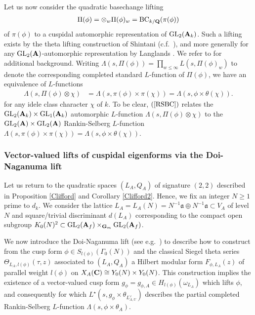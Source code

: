 \documentclass{amsart}
\theoremstyle{definition}
\theoremstyle{definition}
\theoremstyle{definition}
\begin{document}
Let us now consider the quadratic basechange lifting 
\begin{align*} \Pi(\phi) = \otimes_w \Pi(\phi)_w = \operatorname{BC}_{k/{\bf{Q}}}(\pi(\phi)) \end{align*} 
of $\pi(\phi)$ to a cuspidal automorphic representation of $\operatorname{GL}_2({\bf{A}}_k)$. Such a lifting exists by the theta 
lifting construction of Shintani (c.f.~\cite[$\S$2.7]{Br-123}), and more generally for any $\operatorname{GL}_2({\bf{A}})$-automorphic 
representation by Langlands \cite{La}. We refer to \cite{GL} for additional background.
Writing $\Lambda(s, \Pi(\phi)) = \prod_{w \leq \infty} L(s, \Pi(\phi)_w)$ to denote the corresponding completed 
standard $L$-function of $\Pi(\phi)$, we have an equivalence of $L$-functions 
\begin{align}\label{RSBC} \Lambda(s, \Pi(\phi) \otimes \chi) &= \Lambda(s, \pi(\phi) \times \pi(\chi)) = \Lambda(s, \phi \times \theta(\chi)).\end{align}
for any idele class character $\chi$ of $k$.
To be clear, $(\ref{RSBC})$ relates the $\operatorname{GL}_2({\bf{A}}_k) \times \operatorname{GL}_1({\bf{A}}_k)$
automorphic $L$-function $\Lambda(s, \Pi(\phi) \otimes \chi)$ to the $\operatorname{GL}_2({\bf{A}}) \times \operatorname{GL}_2({\bf{A}})$ 
Rankin-Selberg $L$-function $ \Lambda(s, \pi(\phi) \times \pi(\chi)) = \Lambda(s, \phi \times \theta(\chi))$.

\subsubsection{Vector-valued lifts of cuspidal eigenforms via the Doi-Naganuma lift}

Let us return to the quadratic spaces $(L_A, Q_A)$ of signature $(2,2)$ described in Proposition \ref{Clifford} and Corollary \ref{Clifford2}. 
Hence, we fix an integer $N \geq 1$ prime to $d_k$. We consider the lattice $L_A = L_A(N) = N^{-1} \mathfrak{a} \oplus N^{-1} \mathfrak{a} \subset V_A$
of level $N$ and square/trivial discriminant $d(L_A)$ corresponding to the compact open subgroup $K_0(N)^2 \subset  \operatorname{GL}_2({\bf{A}}_f) \times_{{\bf{G}}_m} \operatorname{GL}_2({\bf{A}}_f)$.

We now introduce the Doi-Naganuma lift (see e.g.~\cite[$\S$3.1]{Br-123}) to describe how to construct from the  
cusp form $\phi \in S_{l(\phi)}(\Gamma_0(N))$ and the classical Siegel theta series 
$\Theta_{L_A, l(\phi)}(\tau, z)$ associated to $(L_A, Q_A)$ a Hilbert modular form $F_{\phi, L_A}(z)$ of parallel
weight $l(\phi)$ on $X_A({\bf{C}}) \cong Y_0(N) \times Y_0(N)$. This construction implies the existence of a 
vector-valued cusp form $g_{\phi} = g_{\phi, A} \in H_{l(\phi)}(\omega_{L_A})$ which lifts $\phi$, and 
consequently for which $L^{\star}(s, g_{\phi} \times \theta_{L_{A, U}^{\vee}})$ describes the partial completed Rankin-Selberg $L$-function $\Lambda(s, \phi \times \theta_{A})$. 
\end{document}
